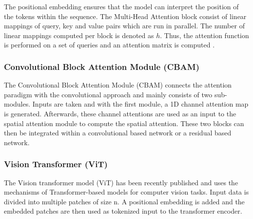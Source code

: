 The positional embedding ensures that the model can interpret the position of the tokens within the sequence. The Multi-Head Attention block consist of linear mappings of query, key and value pairs which are run in parallel. The number of linear mappings computed per block is denoted as $h$. Thus, the attention function is performed on a set of queries and an attention matrix is computed \cite{vaswani_attention_2023}.

\subsubsection{Convolutional Block Attention Module (CBAM)}
The Convolutional Block Attention Module (CBAM) connects the attention paradigm with the convolutional approach and mainly consists of two sub-modules. Inputs are taken and with the first module, a 1D channel attention map is generated. Afterwards, these channel attentions are used as an input to the spatial attention module to compute the spatial attention. These two blocks can then be integrated within a convolutional based network or a residual based network.

\subsubsection{Vision Transformer (ViT)}
The Vision transformer model (ViT) has been recently published \cite{dosovitskiy_image_2021} and uses the mechanisms of Transformer-based models for computer vision tasks. Input data is divided into multiple patches of size n. A positional embedding is added and the embedded patches are then used as tokenized input to the transformer encoder. 




